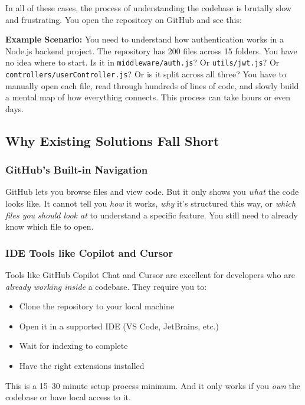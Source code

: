 \documentclass[a4paper,11pt]{article}
\begin{document}
In all of these cases, the process of understanding the codebase is brutally slow and frustrating. You open the repository on GitHub and see this:

\begin{mdframed}[style=notebox]
\textbf{Example Scenario:} You need to understand how authentication works in a Node.js backend project. The repository has 200 files across 15 folders. You have no idea where to start. Is it in \texttt{middleware/auth.js}? Or \texttt{utils/jwt.js}? Or \texttt{controllers/userController.js}? Or is it split across all three? You have to manually open each file, read through hundreds of lines of code, and slowly build a mental map of how everything connects. This process can take hours or even days.
\end{mdframed}

\subsection{Why Existing Solutions Fall Short}

\subsubsection{GitHub's Built-in Navigation}
GitHub lets you browse files and view code. But it only shows you \textit{what} the code looks like. It cannot tell you \textit{how} it works, \textit{why} it's structured this way, or \textit{which files you should look at} to understand a specific feature. You still need to already know which file to open.

\subsubsection{IDE Tools like Copilot and Cursor}
Tools like GitHub Copilot Chat and Cursor are excellent for developers who are \textit{already working inside} a codebase. They require you to:
\begin{itemize}
    \item Clone the repository to your local machine
    \item Open it in a supported IDE (VS Code, JetBrains, etc.)
    \item Wait for indexing to complete
    \item Have the right extensions installed
\end{itemize}
This is a 15--30 minute setup process minimum. And it only works if you \textit{own} the codebase or have local access to it.
\end{document}
